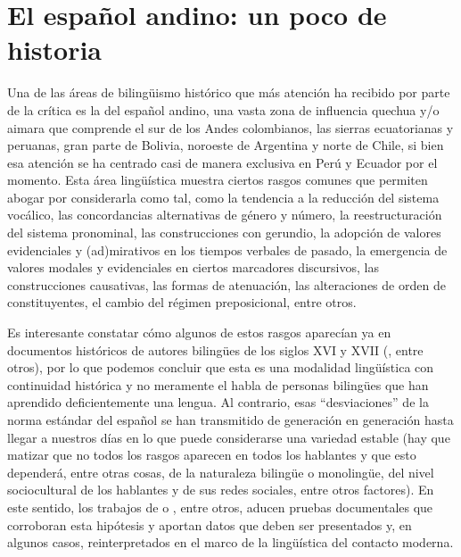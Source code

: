 \documentclass[output=paper]{../langscibook}
\begin{document}
\section{El español andino: un poco de historia}\label{sec:palacios:2}


Una de las áreas de bilingüismo histórico que más atención ha recibido por parte de la crítica es la del español andino, una vasta zona de influencia quechua y/o aimara que comprende el sur de los Andes colombianos, las sierras ecuatorianas y peruanas, gran parte de Bolivia, noroeste de Argentina y norte de Chile, si bien esa atención se ha centrado casi de manera exclusiva en Perú y Ecuador por el momento. Esta área lingüística muestra ciertos rasgos comunes que permiten abogar por considerarla como tal, como la tendencia a la reducción del sistema vocálico, las concordancias alternativas de género y número, la reestructuración del sistema pronominal, las construcciones con gerundio, la adopción de valores evidenciales y (ad)mirativos en los tiempos verbales de pasado, la emergencia de valores modales y evidenciales en ciertos marcadores discursivos, las construcciones causativas, las formas de atenuación, las alteraciones de orden de constituyentes, el cambio del régimen preposicional, entre otros.

Es interesante constatar cómo algunos de estos rasgos aparecían ya en documentos históricos de autores bilingües de los siglos XVI y XVII (\citealt{Cerrón-Palomino1992,Cerrón-Palomino1995,Cerrón-Palomino2004,Cerrón-Palomino2010,NavarroGala2007,NavarroGala2015,PalaciosAlcaine1996,PalaciosAlcaine1998,PalaciosAlcaine2000,PalaciosAlcaine2002,RivarolaRubio1989,RivarolaRubio1995,RivarolaRubio1990a,RivarolaRubio1990b}, entre otros), por lo que podemos concluir que esta es una modalidad lingüística con continuidad histórica y no meramente el habla de personas bilingües que han aprendido deficientemente una lengua. Al contrario, esas “desviaciones” de la norma estándar del español se han transmitido de generación en generación hasta llegar a nuestros días en lo que puede considerarse una variedad estable (hay que matizar que no todos los rasgos aparecen en todos los hablantes y que esto dependerá, entre otras cosas, de la naturaleza bilingüe o monolingüe, del nivel sociocultural de los hablantes y de sus redes sociales, entre otros factores). En este sentido, los trabajos de  \citet{Calvo-Pérez2008,Delforge2012,Escobar2000,Escobar2011,GarateaGrau2004,GarateaGrau2009,GarcíaTesoro2013,DeGranda2001a,Haboud1998,PalaciosAlcaine2007idayvuelta,PalaciosAlcaine2011,PalaciosAlcaine2013,PalaciosAlcaine2015,PalaciosAlcaine2017book,Pfänder2009,PfänderPalaciosAlcaine2013} o \citet{Zavala1999}, entre otros, aducen pruebas documentales que corroboran esta hipótesis y aportan datos que deben ser presentados y, en algunos casos, reinterpretados en el marco de la lingüística del contacto moderna.
\end{document}
